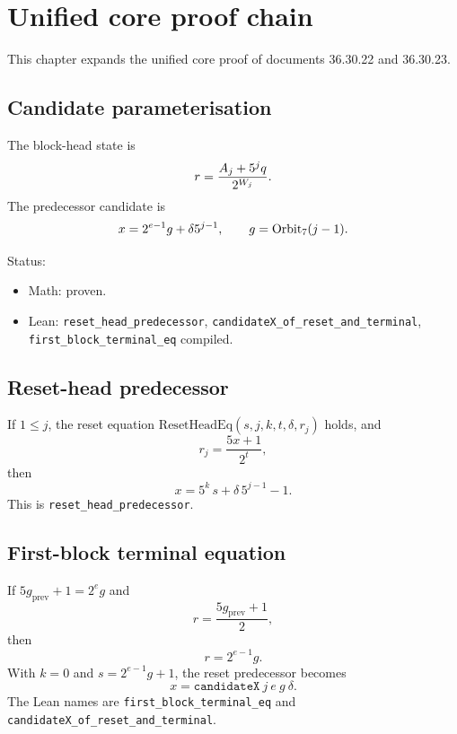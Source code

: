 \section{Unified core proof chain}

This chapter expands the unified core proof of documents 36.30.22 and
36.30.23.

\subsection{Candidate parameterisation}

The block-head state is
\begin{equation*}
  r=\frac{A_j+5^jq}{2^{W_j}}.
\end{equation*}
The predecessor candidate is
\begin{equation*}
  x=2^{e-1}g+\delta5^{j-1},
\qquad g=\mathrm{Orbit}_7(j-1).
\end{equation*}

Status:
\begin{itemize}[leftmargin=*]
\item Math: proven.
\item Lean: \texttt{reset\_head\_predecessor},
  \texttt{candidateX\_of\_reset\_and\_terminal},
  \texttt{first\_block\_terminal\_eq} compiled.
\end{itemize}

\subsection{Reset-head predecessor}

\begin{lemma}
If $1\le j$, the reset equation
$\mathrm{ResetHeadEq}(s,j,k,t,\delta,r_j)$ holds, and
\begin{equation*}
  r_j=\frac{5x+1}{2^t},
\end{equation*}
then
\begin{equation*}
  x=5^k\,s+\delta\,5^{j-1}-1.
\end{equation*}
This is \texttt{reset\_head\_predecessor}.
\end{lemma}

\subsection{First-block terminal equation}

\begin{lemma}
If $5g_{\mathrm{prev}}+1=2^eg$ and
\begin{equation*}
  r=\frac{5g_{\mathrm{prev}}+1}{2},
\end{equation*}
then
\begin{equation*}
  r=2^{e-1}g.
\end{equation*}
With $k=0$ and $s=2^{e-1}g+1$, the reset predecessor becomes
\begin{equation*}
  x=\texttt{candidateX}\ j\ e\ g\ \delta.
\end{equation*}
The Lean names are \texttt{first\_block\_terminal\_eq} and
\texttt{candidateX\_of\_reset\_and\_terminal}.
\end{lemma}

